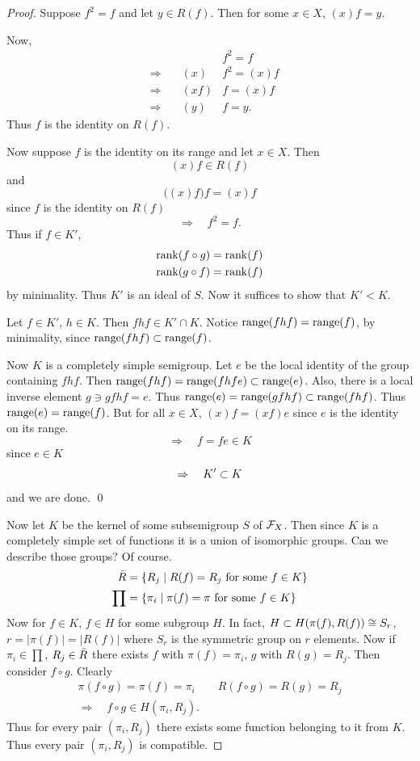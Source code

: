 \begin{proof} Suppose $f^2 = f$ and let $y \in R(f)$.  Then for
     some $x \in X$, $(x)f = y$.

Now,
\[
\begin{alignedat}{2}
     & &\quad &f^2 = f     \\
     &\Rightarrow &\quad (x)&f^2 = (x)f                      \\
     &\Rightarrow &\quad (xf)&f = (x)f                       \\
     &\Rightarrow &\quad(y)&f = y.
     \end{alignedat}
\]
Thus $f$ is the identity on $R(f)$.

Now suppose $f$ is the identity on its range and let $x \in X$.
Then
\[
  (x)f \in R(f)
\]
and
\[
     \big( (x)f \big)f = (x)f
\]
since $f$ is the identity on $R(f)$
\[
     \Rightarrow \quad f^2 = f.
\]
Thus if $f \in K'$,
\[
\begin{aligned}
       \operatorname{rank}(f \circ g) &= \operatorname{rank}(f)                \\
       \operatorname{rank}(g \circ f) &= \operatorname{rank}(f)
\end{aligned}
\]
by minimality.  Thus $K'$ is an ideal of $S$.  Now it suffices to show
that $K' < K$.

     Let $f \in K'$, $h \in K$.  Then $fhf \in K' \cap K$.  Notice
$\operatorname{range}(fhf) = \operatorname{range}(f)$, by minimality, since $\operatorname{range}(fhf) \subset
\operatorname{range}(f)$.

     Now $K$ is a completely simple semigroup.  Let $e$ be the local
identity of the group containing $fhf$.  Then $\operatorname{range}(fhf) =
\operatorname{range}(fhfe) \subset \operatorname{range}(e)$.  Also, there is a local inverse element
$g \ni gfhf = e$.  Thus $\operatorname{range}(e) = \operatorname{range}(gfhf) \subset \operatorname{range}(fhf)$.
Thus $\operatorname{range}(e) = \operatorname{range}(f)$.  But for all $x \in X$, $(x)f = (xf)e$
since $e$ is the identity on its range.
\[
     \Rightarrow \quad f = fe \in K
\]
since $e \in K$
\[
     \Rightarrow \quad K' \subset K
\]
and we are done.  \qed

     Now let $K$ be the kernel of some subsemigroup $S$ of $\mathcal{F}_X$.
Then since $K$ is a completely simple set of functions it is a union
of isomorphic groups.  Can we describe those groups?  Of course.
\[
\begin{aligned}
       {\bar R} &= \{ R_j \mid R(f) = R_j \hbox{ for some } f \in K \} \\
       \prod &= \{ \pi_i \mid \pi(f) = \pi
                   \hbox{ for some } f \in K \}
\end{aligned}
\]
Now for $f \in K$, $f \in H$ for some subgroup $H$.  In fact, $H \subset
H(\pi(f),R(f)) \cong S_r$, $r = |\pi(f)| = |R(f)|$ where $S_r$ is the
symmetric group on $r$ elements.  Now if $\pi_i \in \prod$, $R_j \in
{\bar R}$ there exists $f$ with $\pi(f) = \pi_i$, $g$ with $R(g) = R_j$.
Then consider $f \circ g$.  Clearly
\[
     \begin{gathered}
       \pi(f \circ g) = \pi(f) = \pi_i \qquad
          R(f \circ g) = R(g) = R_j                \\
       \Rightarrow \quad f \circ g \in H(\pi_i,R_j).
     \end{gathered}
\]
Thus for every pair $(\pi_i,R_j)$ there exists some function belonging
to it from $K$.  Thus every pair $(\pi_i,R_j)$ is compatible.


\end{proof}
